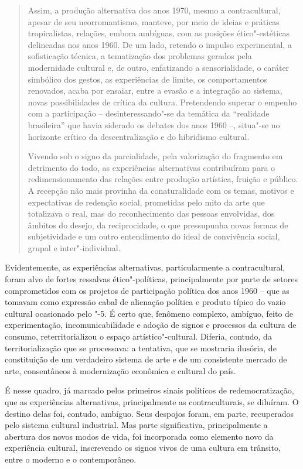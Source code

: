 \begin{quote} %
Assim, a produção alternativa dos anos 1970, mesmo a contracultural,
apesar de seu neorromantismo, manteve, por meio de ideias e práticas
tropicalistas, relações, embora ambíguas, com as posições
ético"-estéticas delineadas nos anos 1960. De um lado, retendo o impulso
experimental, a sofisticação técnica, a tematização dos problemas
gerados pela modernidade cultural e, de outro, enfatizando a
sensorialidade, o caráter simbólico dos gestos, as experiências de
limite, os comportamentos renovados, acaba por ensaiar, entre a evasão e
a integração ao sistema, novas possibilidades de crítica da cultura.
Pretendendo superar o empenho com a participação -- desinteressando"-se
da temática da ``realidade brasileira'' que havia siderado os debates
dos anos 1960 --, situa"-se no horizonte crítico da descentralização e do
hibridismo cultural.

Vivendo sob o signo da parcialidade, pela valorização do fragmento em
detrimento do todo, as experiências alternativas contribuíram para o
redimensionamento das relações entre produção artística, fruição e
público. A recepção não mais provinha da conaturalidade com os temas,
motivos e expectativas de redenção social, prometidas pelo mito da arte
que totalizava o real, mas do reconhecimento das pessoas envolvidas, dos
âmbitos do desejo, da reciprocidade, o que pressupunha novas formas de
subjetividade e um outro entendimento do ideal de convivência social,
grupal e inter"-individual.
\end{quote}

Evidentemente, as experiências alternativas, particularmente a
contracultural, foram alvo de fortes ressalvas ético"-políticas,
principalmente por parte de setores comprometidos com os projetos de
participação política dos anos 1960 -- que as tomavam como expressão
cabal de alienação política e produto típico do vazio cultural
ocasionado pelo "-5. É certo que, fenômeno complexo, ambíguo, feito de
experimentação, incomunicabilidade e adoção de signos e processos da
cultura de consumo, reterritorializou o espaço artístico"-cultural.
Diferia, contudo, da territorialização que se processava: a tentativa,
que se mostraria ilusória, de constituição de um verdadeiro sistema de
arte e de um consistente mercado de arte, consentâneos à modernização
econômica e cultural do país.

É nesse quadro, já marcado pelos primeiros sinais políticos de
redemocratização, que as experiências alternativas, principalmente as
contraculturais, se diluíram. O destino delas foi, contudo, ambíguo.
Seus despojos foram, em parte, recuperados pelo sistema cultural
industrial. Mas parte significativa, principalmente a abertura dos novos
modos de vida, foi incorporada como elemento novo da experiência
cultural, inscrevendo os signos vivos de uma cultura em trânsito, entre
o moderno e o contemporâneo.

